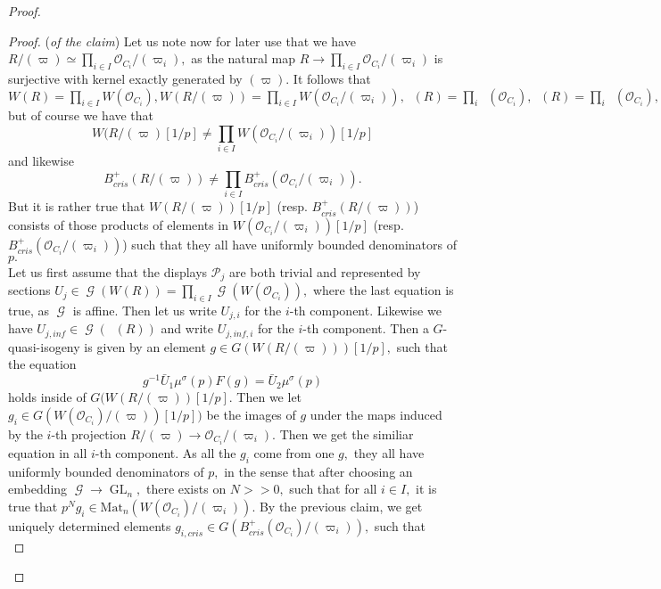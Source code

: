 \documentclass[a4paper,10,5 pt]{amsart}
\theoremstyle{definition}
\DeclareMathOperator{\GL}{GL}
\DeclareMathOperator{\Acris}{\mathbb{A}_{cris}}
\DeclareMathOperator{\Ainf}{\mathbb{A}_{inf}}
\DeclareMathOperator{\G}{\mathcal{G}}
\begin{document}
\begin{proof}
\begin{equation}
\end{equation}
\begin{proof}{(\textit{of the claim})}
Let us note now for later use that we have $R/(\varpi)\simeq \prod_{i\in I}\mathcal{O}_{C_{i}}/(\varpi_{i}),$ as the natural map $R\rightarrow \prod_{i\in I}\mathcal{O}_{C_{i}}/(\varpi_{i})$ is surjective with kernel exactly generated by $(\varpi).$ It follows that $W(R)=\prod_{i\in I}W(\mathcal{O}_{C_{i}}),W(R/(\varpi))=\prod_{i\in I}W(\mathcal{O}_{C_{i}}/(\varpi_{i})),\Ainf(R)=\prod_{i}\Ainf(\mathcal{O}_{C_{i}}),\Acris(R)=\prod_{i}\Acris(\mathcal{O}_{C_{i}}),$ but of course we have that $$W(R/(\varpi)[1/p]\neq \prod_{i\in I}W(\mathcal{O}_{C_{i}}/(\varpi_{i}))[1/p]$$ and likewise $$B_{cris}^{+}(R/(\varpi))\neq \prod_{i\in I}B_{cris}^{+}(\mathcal{O}_{C_{i}}/(\varpi_{i})).$$
But it is rather true that $W(R/(\varpi))[1/p]$ (resp. $B_{cris}^{+}(R/(\varpi))$) consists of those products of elements in $W(\mathcal{O}_{C_{i}}/(\varpi_{i}))[1/p]$ (resp. $B_{cris}^{+}(\mathcal{O}_{C_{i}}/(\varpi_{i}))$) such that they all have uniformly bounded denominators of $p.$
\\
Let us first assume that the displays $\mathcal{P}_{j}$ are both trivial and represented by sections $U_{j}\in\G(W(R))=\prod_{i\in I}\G(W(\mathcal{O}_{C_{i}})),$ where the last equation is true, as $\G$ is affine. Then let us write $U_{j,i}$ for the $i$-th component. Likewise we have $U_{j,inf}\in \G(\Ainf(R))$ and write $U_{j,inf,i}$ for the $i$-th component. Then a $G$-quasi-isogeny is given by an element $g\in G(W(R/(\varpi)))[1/p],$ such that the equation
\begin{equation}
g^{-1}\bar{U}_{1}\mu^{\sigma}(p)F(g)=\bar{U}_{2}\mu^{\sigma}(p)
\end{equation}
holds inside of $G(W(R/(\varpi))[1/p].$ Then we let $g_{i}\in G(W(\mathcal{O}_{C_{i}})/(\varpi))[1/p])$ be the images of $g$ under the maps induced by the $i$-th projection $R/(\varpi)\rightarrow \mathcal{O}_{C_{i}}/(\varpi_{i}).$
Then we get the similiar equation in all $i$-th component. As all the $g_{i}$ come from one $g,$ they all have uniformly bounded denominators of $p,$ in the sense that after choosing an embedding $\G\rightarrow \GL_{n},$ there exists on $N>>0,$ such that for all $i\in I,$ it is true that $p^{N}g_{i}\in \text{Mat}_{n}(W(\mathcal{O}_{C_{i}})/(\varpi_{i})).$ By the previous claim, we get uniquely determined elements $g_{i,cris}\in G(B_{cris}^{+}(\mathcal{O}_{C_{i}})/(\varpi_{i})),$ such that
\begin{equation}\label{Gleichungen in den Komponenten kristalline Qis}

\end{equation}
\end{proof}
\end{proof}
\end{document}
